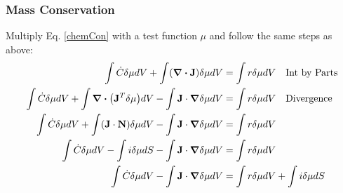 \documentclass[12pt,3p]{article}
\numberwithin{equation}{section}
\begin{document}
\subsubsection{Mass Conservation}
Multiply Eq. \ref{chemCon} with a test function $\mu$ and follow the same steps as above: 
\begin{align*}
\int {\dot{C}} \delta \mu dV + \int ( \div \mathbf{J}) \delta \mu dV &= \int r \delta \mu dV \quad \text{Int by Parts} \\ 
\int {\dot{C}} \delta \mu dV + \int \div (\mathbf{J}^T \delta \mu) dV - \int \mathbf{J} \cdot \grad \delta \mu dV &= \int r \delta \mu dV \quad \text{Divergence} \\
 \int {\dot{C}} \delta \mu dV + \int (\mathbf{J} \cdot \mathbf{N}) \delta \mu dV - \int \mathbf{J} \cdot \grad \delta \mu dV &= \int r \delta \mu dV \\
 \int {\dot{C}} \delta \mu dV - \int i \delta \mu dS - \int \mathbf{J} \cdot \grad \delta \mu dV &= \int r \delta \mu dV \\
 \int {\dot{C}} \delta \mu dV - \int \mathbf{J} \cdot \grad \delta \mu dV &= \int r \delta \mu dV + \int i \delta \mu dS 
\end{align*}

\end{document}
